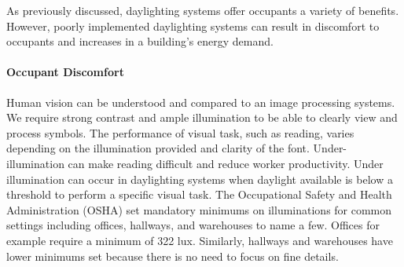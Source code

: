     As previously discussed, daylighting systems offer occupants a variety of benefits. However, poorly implemented daylighting systems can result in discomfort to occupants and increases in a building's energy demand.

    \paragraph{Occupant Discomfort}

    Human vision can be understood and compared to an image processing systems.
    We require strong contrast and ample illumination to be able to clearly view and process symbols.
    The performance of visual task, such as reading, varies depending on the illumination provided and clarity of the font.
    Under-illumination can make reading difficult and reduce worker productivity\cite{boyce}.
    Under illumination can occur in daylighting systems when daylight available is below a threshold to perform a specific visual task.
    The Occupational Safety and Health Administration (OSHA) set mandatory minimums on illuminations for common settings including offices, hallways, and warehouses to name a few.
    Offices for example require a minimum of 322 lux.
    Similarly, hallways and warehouses have lower minimums set because there is no need to focus on fine details\cite{OSHA}. \\

